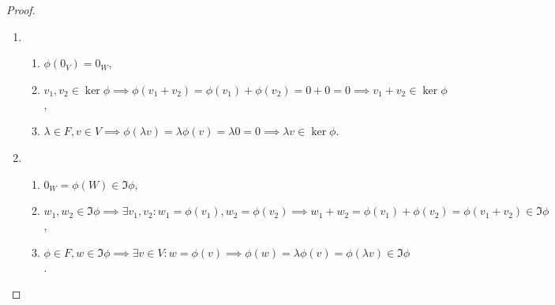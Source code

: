 \begin{proof}~
    \begin{enumerate}
    \item 
        \begin{enumerate}
        \item $\phi(0_V) = 0_W$,
        \item $v_1, v_2 \in \ker \phi \implies \phi(v_1 + v_2) = \phi(v_1) + \phi(v_2) = 0 + 0 = 0 \implies v_1 + v_2 \in \ker \phi$,
        \item $\lambda \in F, v \in V \implies \phi(\lambda v) = \lambda \phi(v) = \lambda 0 = 0 \implies \lambda v \in \ker \phi$.
        \end{enumerate}

    \item
        \begin{enumerate}
        \item $0_W = \phi(W) \in \Im \phi$,
        \item $w_1, w_2 \in \Im \phi \implies \exists v_1, v_2 : w_1 = \phi(v_1), w_2 = \phi(v_2) \implies w_1 + w_2 = \phi(v_1) + \phi(v_2) = \phi(v_1 + v_2) \in \Im \phi$,
        \item $\phi \in F, w \in \Im \phi \implies \exists v \in V : w = \phi(v) \implies \phi(w) = \lambda \phi(v) = \phi(\lambda v) \in \Im \phi$.
            \qedhere
        \end{enumerate}
    \end{enumerate}
\end{proof}
